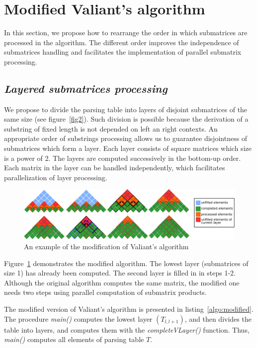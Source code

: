 \section{\bf Modified Valiant's algorithm}

In this section, we propose how to rearrange the order in which submatrices are processed in the algorithm.
The different order improves the independence of submatrices handling and facilitates the implementation of parallel submatrix processing.

\subsection{\bf \it Layered submatrices processing}

We propose to divide the parsing table into layers of disjoint submatrices of the same size (see figure~\ref{fig2}).
Such division is possible because the derivation of a substring of fixed length is not depended on left an right contexts.
An appropriate order of substrings processing allows us to guarantee disjointness of submatrices which form a layer.
Each layer consists of square matrices which size is a power of 2.
The layers are computed successively in the bottom-up order.
Each matrix in the layer can be handled independently, which facilitates parallelization of layer processing.

\begin{figure}
\vspace{3mm}
 \begin{center}
 \includegraphics[width=12cm]{pictures/modivis2.pdf}
    \caption{An example of the modification of Valiant's algorithm}
    \label{fig4}
 \end{center}
\vspace{-8mm}
\end{figure}

Figure~\ref{fig4} demonstrates the modified algorithm.
The lowest layer (submatrices of size 1) has already been computed.
The second layer is filled in in steps 1-2.
Although the original algorithm computes the same matrix, the modified one needs two steps using parallel computation of submatrix products.

The modified version of Valiant's algorithm is presented in listing~\ref{algo:modified}.
The procedure \textit{main()} computes the lowest layer $(T_{l, l+1})$, and then divides the table into layers, and computes them with the \textit{completeVLayer()} function.
Thus, \textit{main()} computes all elements of parsing table $T$.

